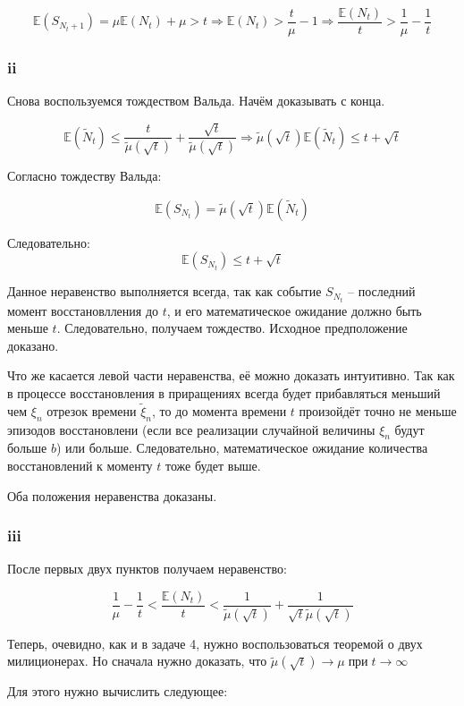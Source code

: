 \documentclass[a4paper,12pt]{article}
\def \mbb{\mathbb}
\def \E{\mbb{E}}
\begin{document}
\[  \E(S_{N_t+1}) = \mu \E(N_t) + \mu > t \Rightarrow \E(N_t) > \frac{t}{\mu} - 1 \Rightarrow \frac{\E(N_t)}{t} > \frac{1}{\mu} - \frac{1}{t}\]

\subsubsection{ii}

Снова воспользуемся тождеством Вальда. Начём доказывать с конца.

\[ \E(\tilde{N}_t)  \le \frac{t}{\tilde{\mu}(\sqrt{t})} + \frac{\sqrt{t}}{\tilde{\mu}(\sqrt{t})} \Rightarrow  \tilde{\mu}(\sqrt{t}) \E(\tilde{N}_t) \le t + \sqrt{t} \]

Согласно тождеству Вальда:

\[ \E(S_{N_t}) =  \tilde{\mu}(\sqrt{t}) \E(\tilde{N}_t) \]


Следовательно:
\[  \E(S_{N_t}) \le t + \sqrt{t}  \]

Данное неравенство выполняется всегда, так как событие $ S_{N_t} $ -- последний момент восстановлления до $ t $, и его математическое ожидание должно быть меньше $ t $. Следовательно, получаем тождество. Исходное предположение доказано.

Что же касается левой части неравенства, её можно доказать интуитивно. Так как в процессе восстановления в приращениях всегда будет прибавляться меньший чем $ \xi_n $ отрезок времени $ \tilde{\xi}_n $, то до момента времени $ t $ произойдёт точно не меньше эпизодов восстановлени (если все реализации случайной величины $ \xi_n $ будут больше $ b $) или больше. Следовательно, математическое ожидание количества восстановлений к моменту $ t $ тоже будет выше. 

Оба положения неравенства доказаны.

\subsubsection{iii}

После первых двух пунктов получаем неравенство:

\[ \frac{1}{\mu} - \frac{1 }{t}  < \frac{\E(N_t)}{t} < \frac{1}{\tilde{\mu}(\sqrt{t})} +\frac{1}{\sqrt{t}\tilde{\mu}(\sqrt{t})} \]

Теперь, очевидно, как и в задаче 4, нужно воспользоваться теоремой о двух милиционерах. Но сначала нужно доказать, что $\tilde{\mu}(\sqrt{t}) \rightarrow \mu \operatorname{ при } t \rightarrow \infty$

Для этого нужно вычислить следующее:
\end{document}
